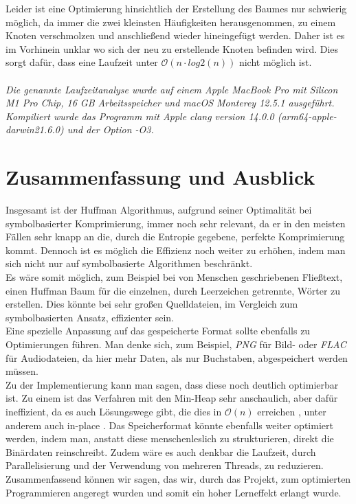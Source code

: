 \documentclass[course=erap]{aspdoc}
\begin{document}
Leider ist eine Optimierung hinsichtlich der Erstellung des Baumes nur schwierig möglich, da immer die zwei kleinsten Häufigkeiten herausgenommen, zu einem Knoten verschmolzen und anschließend wieder hineingefügt werden. Daher ist es im Vorhinein unklar wo sich der neu zu erstellende Knoten befinden wird. Dies sorgt dafür, dass eine Laufzeit unter $\mathcal{O}(n\cdot log2(n))$ nicht möglich ist.\\\\
\textit{
Die genannte Laufzeitanalyse wurde auf einem Apple MacBook Pro mit Silicon M1 Pro Chip, 16 GB Arbeitsspeicher und macOS Monterey 12.5.1 ausgeführt. Kompiliert wurde das Programm mit Apple clang version 14.0.0 (arm64-apple-darwin21.6.0) und der Option -O3. 
}

\section{Zusammenfassung und Ausblick}

Insgesamt ist der Huffman Algorithmus, aufgrund seiner Optimalität bei symbolbasierter Komprimierung, immer noch sehr relevant, da er in den meisten Fällen sehr knapp an die, durch die Entropie gegebene, perfekte Komprimierung kommt.
Dennoch ist es möglich die Effizienz noch weiter zu erhöhen, indem man sich nicht nur auf symbolbasierte Algorithmen beschränkt.\\
Es wäre somit möglich, zum Beispiel bei von Menschen geschriebenen Fließtext, einen Huffman Baum für die einzelnen, durch Leerzeichen getrennte, Wörter zu erstellen. Dies könnte bei sehr großen Quelldateien, im Vergleich zum symbolbasierten Ansatz, effizienter sein.\\
Eine spezielle Anpassung auf das gespeicherte Format sollte ebenfalls zu Optimierungen führen. Man denke sich, zum Beispiel, \textit{PNG} für Bild- oder \textit{FLAC} für Audiodateien, da hier mehr Daten, als nur Buchstaben, abgespeichert werden müssen.\\
Zu der Implementierung kann man sagen, dass diese noch deutlich optimierbar ist. Zu einem ist das Verfahren mit den Min-Heap sehr anschaulich, aber dafür ineffizient, da es auch Lösungswege gibt, die dies in $\mathcal{O}(n)$ erreichen \cite{Leeuwen1976OnTC}, unter anderem auch in-place \cite{10.1007/3-540-60220-8_79}.
Das Speicherformat könnte ebenfalls weiter optimiert werden, indem man, anstatt diese menschenleslich zu strukturieren, direkt die Binärdaten reinschreibt. Zudem wäre es auch denkbar die Laufzeit, durch Parallelisierung und der Verwendung von mehreren Threads, zu reduzieren.\\
Zusammenfassend können wir sagen, das wir, durch das Projekt, zum optimierten Programmieren angeregt wurden und somit ein hoher Lerneffekt erlangt wurde.


{}
\end{document}
